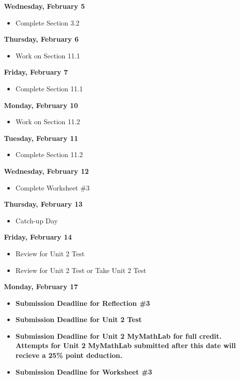 \documentclass[11pt]{article}
\begin{document}
\textbf{Wednesday, February 5}

\begin{itemize}
\item Complete Section 3.2
\end{itemize}

\textbf{Thursday, February 6}

\begin{itemize}
\item Work on Section 11.1
\end{itemize}

\textbf{Friday, February 7}

\begin{itemize}
\item Complete Section 11.1
\end{itemize}

\textbf{Monday, February 10}

\begin{itemize}
\item Work on Section 11.2
\end{itemize}

\textbf{Tuesday, February 11}

\begin{itemize}
\item Complete Section 11.2
\end{itemize}

\textbf{Wednesday, February 12}

\begin{itemize}
\item Complete Worksheet \#3
\end{itemize}

\textbf{Thursday, February 13}

\begin{itemize}
\item Catch-up Day
\end{itemize}

\textbf{Friday, February 14}

\begin{itemize}
\item Review for Unit 2 Test
\item Review for Unit 2 Test or Take Unit 2 Test
\end{itemize}

\textbf{Monday, February 17}

\begin{itemize}
\item \textbf{Submission Deadline for Reflection \#3}
\item \textbf{Submission Deadline for Unit 2 Test}
\item \textbf{Submission Deadline for Unit 2 MyMathLab for full credit. Attempts for Unit 2 MyMathLab submitted after this date will recieve a 25\% point deduction.}
\item \textbf{Submission Deadline for Worksheet \#3}
\end{itemize}
\end{document}
